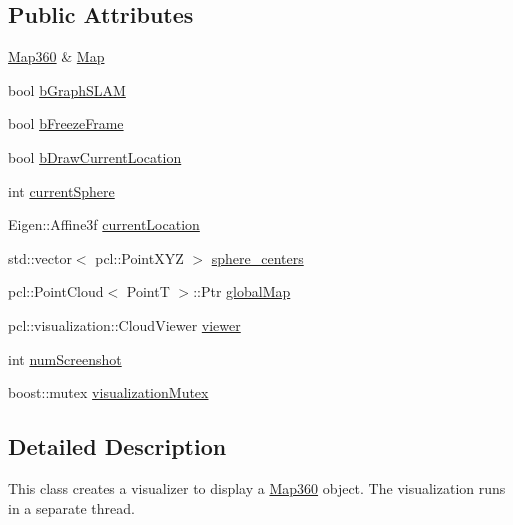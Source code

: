 \subsection*{Public Attributes}
\begin{DoxyCompactItemize}
\item 
\hyperlink{structMap360}{Map360} \& \hyperlink{classMap360__Visualizer_ad423e3bba917cfed4b8a7f08a27a0a15}{Map}
\item 
bool \hyperlink{classMap360__Visualizer_a1951f5fab820696abf4a8706ee2a2e7f}{b\-Graph\-S\-L\-A\-M}
\item 
bool \hyperlink{classMap360__Visualizer_a2794e5ff22d05c4436da0edeb41db95b}{b\-Freeze\-Frame}
\item 
bool \hyperlink{classMap360__Visualizer_aaac4aa1c98ee63511c9599625bc6bd54}{b\-Draw\-Current\-Location}
\item 
int \hyperlink{classMap360__Visualizer_a5aaaa8aa47c18934cf366e5bb3ceb2be}{current\-Sphere}
\item 
Eigen\-::\-Affine3f \hyperlink{classMap360__Visualizer_a53d4d24b998db0f3437227fb308ef77d}{current\-Location}
\item 
std\-::vector$<$ pcl\-::\-Point\-X\-Y\-Z $>$ \hyperlink{classMap360__Visualizer_a788f1a552e4511c3c2169e42a0d2296e}{sphere\-\_\-centers}
\item 
pcl\-::\-Point\-Cloud$<$ Point\-T $>$\-::Ptr \hyperlink{classMap360__Visualizer_a8295556bb6814e8c7e510b0ae66beb6e}{global\-Map}
\item 
pcl\-::visualization\-::\-Cloud\-Viewer \hyperlink{classMap360__Visualizer_ad9217d08c210272984708a05d44fd2c0}{viewer}
\item 
int \hyperlink{classMap360__Visualizer_aec44a88b16240561335ba7c6b34f8cf5}{num\-Screenshot}
\item 
boost\-::mutex \hyperlink{classMap360__Visualizer_ae0a693e05320051180b367b0d300b328}{visualization\-Mutex}
\end{DoxyCompactItemize}


\subsection{Detailed Description}
This class creates a visualizer to display a \hyperlink{structMap360}{Map360} object. The visualization runs in a separate thread. 

